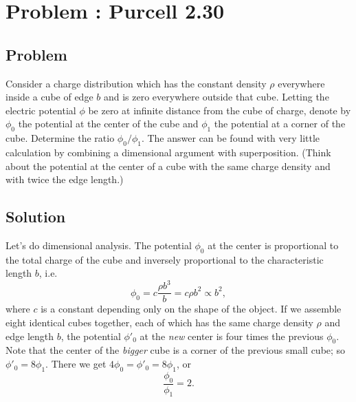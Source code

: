 \documentclass[solutions]{esg8022pset}
\renewcommand{\d}{\,d}
\begin{document}
\section{Problem \thesection: Purcell 2.30}
\subsection{Problem}
  Consider a charge distribution which has the constant density $\rho$ everywhere inside a cube of edge $b$ and is zero everywhere outside that cube. Letting the electric potential $\phi$ be zero at infinite distance from the cube of charge, denote by $\phi_0$ the potential at the center of the cube and $\phi_1$ the potential at a corner of the cube. Determine the ratio $\phi_0/\phi_1$. The answer can be found with very little calculation by combining a dimensional argument with superposition. (Think about the potential at the center of a cube with the same charge density and with twice the edge length.)
\subsection{Solution}
%
  Let's do dimensional analysis.  The potential $\phi_0$ at the center
  is proportional to the total charge of the cube and inversely
  proportional to the characteristic length $b$, i.e.
  \begin{equation*}
    \phi_0 = c \frac{\rho b^3}{b}= c \rho b^2 \propto b^2,
  \end{equation*}
  where $c$ is a constant depending only on the shape of the object.  If
  we assemble eight identical cubes together, each of which has the same
  charge density $\rho$ and edge length $b$, the potential $\phi'_0$ at
  the \emph{new} center is four times the previous $\phi_0$.  Note that the center of the
  \emph{bigger} cube is a corner of the previous small cube; so
  $\phi'_0=8\phi_1$.  There we get $4\phi_0=\phi'_0=8\phi_1$, or
  \[\frac{\phi_0}{\phi_1}=2.\]
\end{document}
